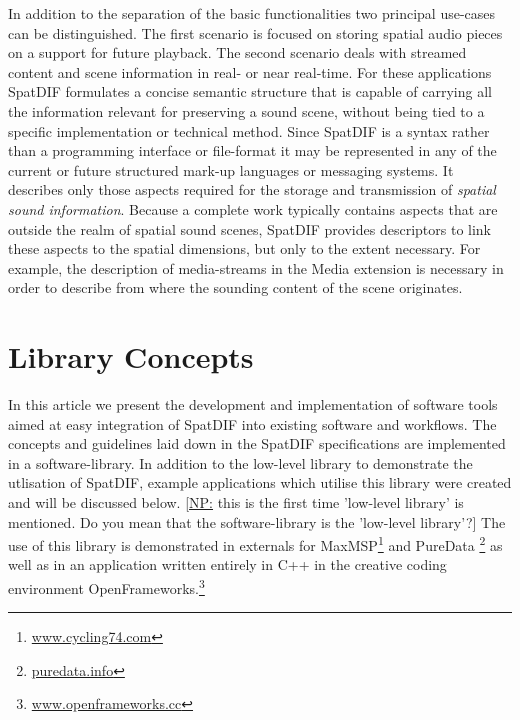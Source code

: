 \documentclass{article}
\newcommand{\np}[1]{\noindent\textcolor{carrotorange}{[\underline{NP:} #1]}}
\begin{document}
In addition to the separation of the basic functionalities two principal use-cases can be distinguished.
The first scenario is focused on storing spatial audio pieces on a support for future playback. 
The second scenario deals with streamed content and scene information in real- or near real-time.
For these applications SpatDIF formulates a concise semantic structure that is capable of carrying all the information relevant for preserving a sound scene, without being tied to a specific implementation or technical method.
Since SpatDIF is a syntax rather than a programming interface or file-format it may be represented in any of the current or future structured mark-up languages or messaging systems.
It describes only those aspects required for the storage and transmission of \emph{spatial sound information}.
Because a complete work typically contains aspects that are outside the realm of spatial sound scenes, SpatDIF provides descriptors to link these aspects to the spatial dimensions, but only to the extent necessary.
For example, the description of media-streams in the Media extension is necessary in order to describe from where the sounding content of the scene originates.

\section{Library Concepts}\label{sec:libspatdif_concepts}

In this article we present the development and implementation of software tools aimed at easy integration of SpatDIF into existing software and workflows.
The concepts and guidelines laid down in the SpatDIF specifications are implemented in a software-library.
In addition to the low-level library to demonstrate the utlisation of SpatDIF, example applications which utilise this library were created and will be discussed below. \np{this is the first time 'low-level library' is mentioned. Do you mean that the software-library is the 'low-level library'?}
The use of this library is demonstrated in externals for MaxMSP\footnote{\href{http://www.cycling74.com}{www.cycling74.com}} and PureData \footnote{\href{http://puredata.info}{puredata.info}} as well as in an application written entirely in C++ in the creative coding environment OpenFrameworks.\footnote{\href{http://www.openframeworks.cc}{www.openframeworks.cc}}
\end{document}
